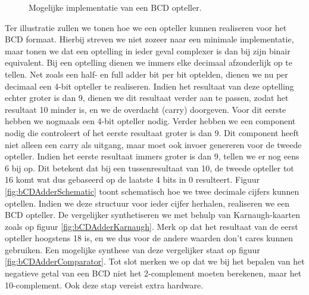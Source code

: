 \begin{figure}[hbt]
{
\label{fig:bCDAdderComparator}}
\caption{Mogelijke implementatie van een BCD opteller.}
\label{fig:bCDAdder}
\end{figure}
Ter illustratie zullen we tonen hoe we een opteller kunnen realiseren voor het BCD formaat. Hierbij streven we niet zozeer naar een minimale implementatie, maar tonen we dat een optelling in ieder geval complexer is dan bij zijn binair equivalent. Bij een optelling dienen we immers elke decimaal afzonderlijk op te tellen. Net zoals een half- en full adder bit per bit optelden, dienen we nu per decimaal een 4-bit opteller te realiseren. Indien het resultaat van deze optelling echter groter is dan 9, dienen we dit resultaat verder aan te passen, zodat het resultaat 10 minder is, en we de overdacht (carry) doorgeven. Voor dit eerste hebben we nogmaals een 4-bit opteller nodig. Verder hebben we een component nodig die controleert of het eerste resultaat groter is dan 9. Dit component heeft niet alleen een carry als uitgang, maar moet ook invoer genereren voor de tweede opteller. Indien het eerste resultaat immers groter is dan 9, tellen we er nog eens 6 bij op. Dit betekent dat bij een tussenresultaat van 10, de tweede opteller tot 16 komt wat dus gebaseerd op de laatste 4 bits in 0 resulteert. Figuur \ref{fig:bCDAdderSchematic} toont schematisch hoe we twee decimale cijfers kunnen optellen. Indien we deze structuur voor ieder cijfer herhalen, realiseren we een BCD opteller. De vergelijker synthetiseren we met behulp van Karnaugh-kaarten zoals op figuur \ref{fig:bCDAdderKarnaugh}. Merk op dat het resultaat van de eerst opteller hoogstens 18 is, en we dus voor de andere waarden don't cares kunnen gebruiken. Een mogelijke synthese van deze vergelijker staat op figuur \ref{fig:bCDAdderComparator}. Tot slot merken we op dat we bij het bepalen van het negatieve getal van een BCD niet het 2-complement moeten berekenen, maar het 10-complement. Ook deze stap vereist extra hardware.
